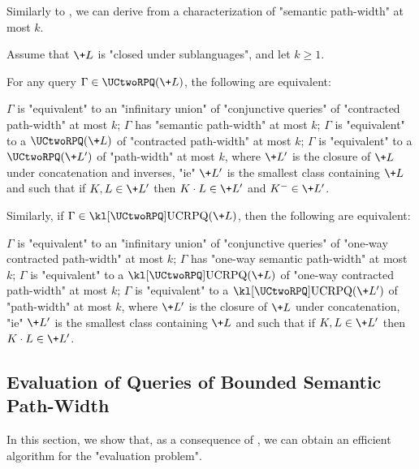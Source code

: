 Similarly to , we can derive from
 a characterization of "semantic path-width" at most $k$.
\begin{corollary}
	\AP\label{coro:charact-semantic-pathwidth-k}
	\AP Assume that $\+L$ is "closed under sublanguages", and let $k \geq 1$. 

	\noindent
    For any query $\Gamma \in \UCtwoRPQ(\+L)$, the following are equivalent:
    \begin{enumerate}
        \itemAP $\Gamma$ is "equivalent" to an "infinitary union" of "conjunctive queries"
            of "contracted path-width" at most $k$;
        \itemAP $\Gamma$ has "semantic path-width" at most $k$;
        \itemAP $\Gamma$ is "equivalent" to a $\UCtwoRPQ(\+L)$ of "contracted path-width" at most $k$;
        \itemAP $\Gamma$ is "equivalent" to a $\UCtwoRPQ(\+L')$ of "path-width" at most $k$,
			where $\+L'$ is the closure of $\+L$ under concatenation and inverses, "ie"
			$\+L'$ is the smallest class containing $\+L$ and such that  if $K, L \in \+L'$
			then $K\cdot L \in \+L'$ and $K^{-} \in \+L'$.
    \end{enumerate}

	\noindent
	Similarly, if $\Gamma \in \UCRPQ(\+L)$, then the following are equivalent:
	\begin{enumerate}
        \itemAP $\Gamma$ is "equivalent" to an "infinitary union" of "conjunctive queries"
            of "one-way contracted path-width" at most $k$;
        \itemAP $\Gamma$ has "one-way semantic path-width" at most $k$;
        \itemAP $\Gamma$ is "equivalent" to a $\UCRPQ(\+L)$ of "one-way contracted path-width" at most $k$;
        \itemAP $\Gamma$ is "equivalent" to a $\UCRPQ(\+L')$ of "path-width" at most $k$,
			where $\+L'$ is the closure of $\+L$ under concatenation, "ie"
			$\+L'$ is the smallest class containing $\+L$ and such that if $K, L \in \+L'$
			then $K\cdot L \in \+L'$.
    \end{enumerate}
\end{corollary}

\subsection{\AP{}Evaluation of Queries of Bounded Semantic Path-Width}

In this section, we show that, as a consequence of , we can obtain an
efficient algorithm for the "evaluation problem".
\paraNLEvalBoundedSemPathWidth

